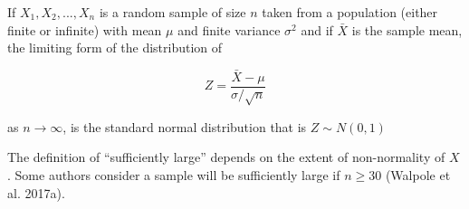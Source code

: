 \documentclass[
  11pt,
  letterpaper,
  DIV=11,
  numbers=noendperiod]{scrreprt}
\begin{document}
\begin{tcolorbox}[enhanced jigsaw, bottomrule=.15mm, toprule=.15mm, title=\textcolor{quarto-callout-note-color}{\faInfo}\hspace{0.5em}{Central limit theorem}, bottomtitle=1mm, colframe=quarto-callout-note-color-frame, coltitle=black, rightrule=.15mm, toptitle=1mm, colbacktitle=quarto-callout-note-color!10!white, titlerule=0mm, breakable, arc=.35mm, leftrule=.75mm, opacitybacktitle=0.6, opacityback=0, colback=white, left=2mm]

If \(X_1,X_2,...,X_n\) is a random sample of size \(n\) taken from a
population (either finite or infinite) with mean \(\mu\) and finite
variance \(\sigma^2\) and if \(\bar X\) is the sample mean, the limiting
form of the distribution of

\[Z=\frac{\bar X-\mu}{\sigma/\sqrt n}\]

as \(n\rightarrow\infty\), is the standard normal distribution that is
\(Z\sim N(0,1)\)

\end{tcolorbox}

The definition of ``sufficiently large'' depends on the extent of
non-normality of \(X\) . Some authors consider a sample will be
sufficiently large if \(n\ge30\) (Walpole et al. 2017a).
\end{document}
